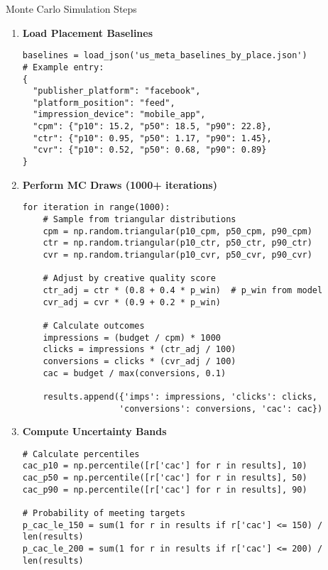 \documentclass[11pt,a4paper]{report}
\begin{document}
\begin{techbox}{Monte Carlo Simulation Steps}
\begin{enumerate}
    \item \textbf{Load Placement Baselines}
    \begin{verbatim}
baselines = load_json('us_meta_baselines_by_place.json')
# Example entry:
{
  "publisher_platform": "facebook",
  "platform_position": "feed",
  "impression_device": "mobile_app",
  "cpm": {"p10": 15.2, "p50": 18.5, "p90": 22.8},
  "ctr": {"p10": 0.95, "p50": 1.17, "p90": 1.45},
  "cvr": {"p10": 0.52, "p50": 0.68, "p90": 0.89}
}
    \end{verbatim}

    \item \textbf{Perform MC Draws (1000+ iterations)}
    \begin{verbatim}
for iteration in range(1000):
    # Sample from triangular distributions
    cpm = np.random.triangular(p10_cpm, p50_cpm, p90_cpm)
    ctr = np.random.triangular(p10_ctr, p50_ctr, p90_ctr)
    cvr = np.random.triangular(p10_cvr, p50_cvr, p90_cvr)

    # Adjust by creative quality score
    ctr_adj = ctr * (0.8 + 0.4 * p_win)  # p_win from model
    cvr_adj = cvr * (0.9 + 0.2 * p_win)

    # Calculate outcomes
    impressions = (budget / cpm) * 1000
    clicks = impressions * (ctr_adj / 100)
    conversions = clicks * (cvr_adj / 100)
    cac = budget / max(conversions, 0.1)

    results.append({'imps': impressions, 'clicks': clicks,
                   'conversions': conversions, 'cac': cac})
    \end{verbatim}

    \item \textbf{Compute Uncertainty Bands}
    \begin{verbatim}
# Calculate percentiles
cac_p10 = np.percentile([r['cac'] for r in results], 10)
cac_p50 = np.percentile([r['cac'] for r in results], 50)
cac_p90 = np.percentile([r['cac'] for r in results], 90)

# Probability of meeting targets
p_cac_le_150 = sum(1 for r in results if r['cac'] <= 150) / len(results)
p_cac_le_200 = sum(1 for r in results if r['cac'] <= 200) / len(results)
    \end{verbatim}
\end{enumerate}
\end{techbox}

\end{document}
